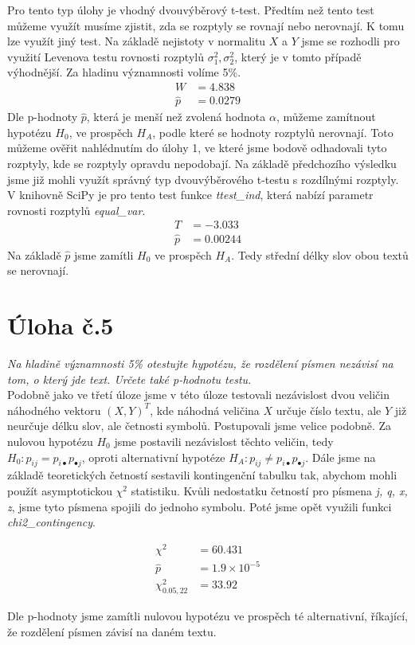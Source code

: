 \documentclass[czech]{mvi-report}
\begin{document}
Pro tento typ úlohy je vhodný dvouvýběrový t-test. Předtím než tento test můžeme využít musíme zjistit, zda se rozptyly se rovnají nebo nerovnají. K tomu lze využít jiný test. Na základě nejistoty v normalitu $ X $ a $ Y $ jsme se rozhodli pro využití Levenova testu rovnosti rozptylů $ \sigma^2_1, \sigma^2_2 $, který je v tomto případě výhodnější. Za hladinu významnosti volíme 5\%.
\begin{align*}
W &= 4.838\\
\hat{p} &= 0.0279
\end{align*}
Dle p-hodnoty $ \hat{p} $, která je menší než zvolená hodnota $ \alpha $, můžeme zamítnout hypotézu $ H_0 $, ve prospěch $ H_A $, podle které se hodnoty rozptylů nerovnají. Toto můžeme ověřit nahlédnutím do úlohy 1, ve které jsme bodově odhadovali tyto rozptyly, kde se rozptyly opravdu nepodobají.
Na základě předchozího výsledku jsme již mohli využít správný typ dvouvýběrového t-testu s rozdílnými rozptyly. V knihovně SciPy je pro tento test funkce \textit{ttest\_ind}, která nabízí parametr rovnosti rozptylů \textit{equal\_var}.
\begin{align*}
T &= -3.033\\
\hat{p} &= 0.00244
\end{align*}
Na základě $ \hat{p} $ jsme zamítli $ H_0 $ ve prospěch $ H_A $. Tedy střední délky slov obou textů se nerovnají.

\section{Úloha č.5}
\textit{Na hladině významnosti 5\% otestujte hypotézu, že rozdělení písmen nezávisí na tom, o který jde text. Určete také p-hodnotu testu.}\\

Podobně jako ve třetí úloze jsme v této úloze testovali nezávislost dvou veličin náhodného vektoru $ (X,Y)^T $, kde náhodná veličina $ X $ určuje číslo textu, ale $ Y $ již neurčuje délku slov, ale četnosti symbolů. Postupovali jsme velice podobně. Za nulovou hypotézu $ H_0 $ jsme postavili nezávislost těchto veličin, tedy $ H_0: p_{ij}=p_{i \bullet} p_{\bullet j} $, oproti alternativní hypotéze $ H_A: p_{ij}\neq p_{i \bullet} p_{\bullet j} $. Dále jsme na základě teoretických četností sestavili kontingenční tabulku tak, abychom mohli použít asymptotickou $ \chi^2 $ statistiku. Kvůli nedostatku četností pro písmena \textit{j, q, x, z}, jsme tyto písmena spojili do jednoho symbolu. Poté jsme opět využili funkci \textit{chi2\_contingency}.

\begin{align*}
\chi^2 &= 60.431\\
\hat{p} &= 1.9\times 10^{-5}\\
\chi^2_{0.05,22} &= 33.92
\end{align*}

Dle p-hodnoty jsme zamítli nulovou hypotézu ve prospěch té alternativní, říkající, že rozdělení písmen závisí na daném textu.
\end{document}
